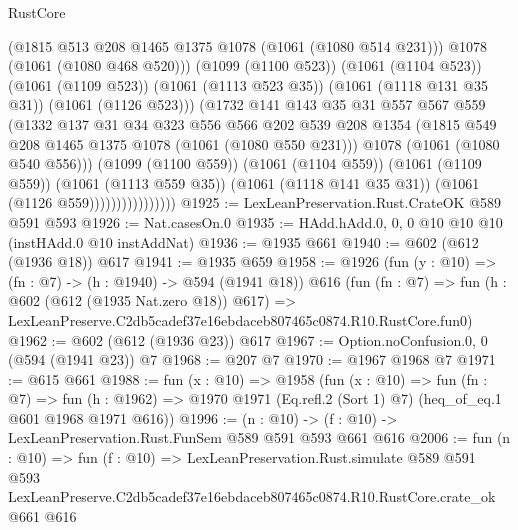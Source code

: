 \begin{lexlean}{RustCore}
\begin{coremodule}
                                  (@1815 @513 @208 @1465 @1375 @1078 (@1061 (@1080 @514 @231)))
                                  @1078
                                  (@1061 (@1080 @468 @520)))
                                (@1099 (@1100 @523))
                                (@1061 (@1104 @523))
                                (@1061 (@1109 @523))
                                (@1061 (@1113 @523 @35))
                                (@1061 (@1118 @131 @35 @31))
                                (@1061 (@1126 @523)))
                              (@1732
                                @141
                                @143
                                @35
                                @31
                                @557
                                @567
                                @559
                                (@1332
                                  @137
                                  @31
                                  @34
                                  @323
                                  @556
                                  @566
                                  @202
                                  @539
                                  @208
                                  @1354
                                  (@1815 @549 @208 @1465 @1375 @1078 (@1061 (@1080 @550 @231)))
                                  @1078
                                  (@1061 (@1080 @540 @556)))
                                (@1099 (@1100 @559))
                                (@1061 (@1104 @559))
                                (@1061 (@1109 @559))
                                (@1061 (@1113 @559 @35))
                                (@1061 (@1118 @141 @35 @31))
                                (@1061 (@1126 @559))))))))))))))))
@1925 := LexLeanPreservation.Rust.CrateOK @589 @591 @593
@1926 := Nat.casesOn.{0}
@1935 := HAdd.hAdd.{0, 0, 0} @10 @10 @10 (instHAdd.{0} @10 instAddNat)
@1936 := @1935 @661
@1940 := @602 (@612 (@1936 @18)) @617
@1941 := @1935 @659
@1958 := @1926
    (fun (y : @10) => (fn : @7) -> (h : @1940) -> @594 (@1941 @18))
    @616
    (fun (fn : @7) =>
    fun (h : @602 (@612 (@1935 Nat.zero @18)) @617) =>
    LexLeanPreserve.C2db5cadef37e16ebdaceb807465c0874.R10.RustCore.fun0)
@1962 := @602 (@612 (@1936 @23)) @617
@1967 := Option.noConfusion.{0, 0} (@594 (@1941 @23)) @7
@1968 := @207 @7
@1970 := @1967 @1968 @7
@1971 := @615 @661
@1988 := fun (x : @10) =>
  @1958
    (fun (x : @10) =>
    fun (fn : @7) =>
    fun (h : @1962) => @1970 @1971 (Eq.refl.{2} (Sort 1) @7) (heq_of_eq.{1} @601 @1968 @1971 @616))
@1996 := (n : @10) -> (f : @10) -> LexLeanPreservation.Rust.FunSem @589 @591 @593 @661 @616
@2006 := fun (n : @10) =>
  fun (f : @10) =>
  LexLeanPreservation.Rust.simulate
    @589
    @591
    @593
    LexLeanPreserve.C2db5cadef37e16ebdaceb807465c0874.R10.RustCore.crate_ok
    @661
    @616
\end{coremodule}
\end{lexlean}
